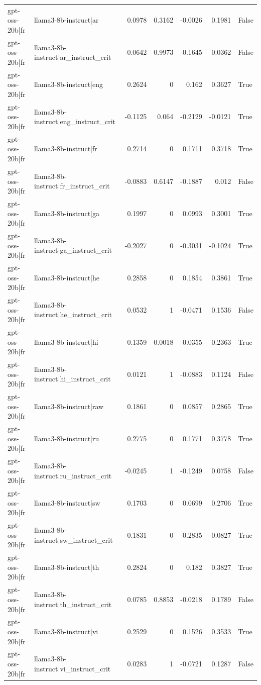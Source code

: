 \begin{table}
\begin{tabular}{l l r r r r l}
gpt-oss-20b|fr & llama3-8b-instruct|ar & 0.0978 & 0.3162 & -0.0026 & 0.1981 & False \\
gpt-oss-20b|fr & llama3-8b-instruct|ar_instruct_crit & -0.0642 & 0.9973 & -0.1645 & 0.0362 & False \\
gpt-oss-20b|fr & llama3-8b-instruct|eng & 0.2624 & 0 & 0.162 & 0.3627 & True \\
gpt-oss-20b|fr & llama3-8b-instruct|eng_instruct_crit & -0.1125 & 0.064 & -0.2129 & -0.0121 & True \\
gpt-oss-20b|fr & llama3-8b-instruct|fr & 0.2714 & 0 & 0.1711 & 0.3718 & True \\
gpt-oss-20b|fr & llama3-8b-instruct|fr_instruct_crit & -0.0883 & 0.6147 & -0.1887 & 0.012 & False \\
gpt-oss-20b|fr & llama3-8b-instruct|ga & 0.1997 & 0 & 0.0993 & 0.3001 & True \\
gpt-oss-20b|fr & llama3-8b-instruct|ga_instruct_crit & -0.2027 & 0 & -0.3031 & -0.1024 & True \\
gpt-oss-20b|fr & llama3-8b-instruct|he & 0.2858 & 0 & 0.1854 & 0.3861 & True \\
gpt-oss-20b|fr & llama3-8b-instruct|he_instruct_crit & 0.0532 & 1 & -0.0471 & 0.1536 & False \\
gpt-oss-20b|fr & llama3-8b-instruct|hi & 0.1359 & 0.0018 & 0.0355 & 0.2363 & True \\
gpt-oss-20b|fr & llama3-8b-instruct|hi_instruct_crit & 0.0121 & 1 & -0.0883 & 0.1124 & False \\
gpt-oss-20b|fr & llama3-8b-instruct|raw & 0.1861 & 0 & 0.0857 & 0.2865 & True \\
gpt-oss-20b|fr & llama3-8b-instruct|ru & 0.2775 & 0 & 0.1771 & 0.3778 & True \\
gpt-oss-20b|fr & llama3-8b-instruct|ru_instruct_crit & -0.0245 & 1 & -0.1249 & 0.0758 & False \\
gpt-oss-20b|fr & llama3-8b-instruct|sw & 0.1703 & 0 & 0.0699 & 0.2706 & True \\
gpt-oss-20b|fr & llama3-8b-instruct|sw_instruct_crit & -0.1831 & 0 & -0.2835 & -0.0827 & True \\
gpt-oss-20b|fr & llama3-8b-instruct|th & 0.2824 & 0 & 0.182 & 0.3827 & True \\
gpt-oss-20b|fr & llama3-8b-instruct|th_instruct_crit & 0.0785 & 0.8853 & -0.0218 & 0.1789 & False \\
gpt-oss-20b|fr & llama3-8b-instruct|vi & 0.2529 & 0 & 0.1526 & 0.3533 & True \\
gpt-oss-20b|fr & llama3-8b-instruct|vi_instruct_crit & 0.0283 & 1 & -0.0721 & 0.1287 & False \\

\end{tabular}
\end{table}

